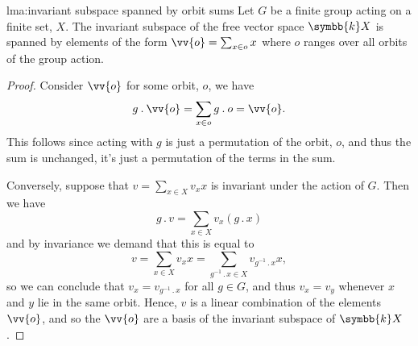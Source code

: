 \documentclass[fleqn]{NotesClass}
\renewcommand{\field}{\symbb{k}}
\newcommand{\action}{\mathbin{.}}
\begin{document}
    \begin{lma}{}{lma:invariant subspace spanned by orbit sums}
        Let \(G\) be a finite group acting on a finite set, \(X\).
        The invariant subspace of the free vector space \(\field X\) is spanned by elements of the form \(\vv{o} = \sum_{x \in o} x\) where \(o\) ranges over all orbits of the group action.
        \begin{proof}
            Consider \(\vv{o}\) for some orbit, \(o\), we have
            \begin{equation}
                g \action \vv{o} = \sum_{x \in o} g \action o = \vv{o}.
            \end{equation}
            This follows since acting with \(g\) is just a permutation of the orbit, \(o\), and thus the sum is unchanged, it's just a permutation of the terms in the sum.
            
            Conversely, suppose that \(v = \sum_{x \in X} v_x x\) is invariant under the action of \(G\).
            Then we have
            \begin{equation}
                g \action v = \sum_{x \in X} v_x (g \action x)
            \end{equation}
            and by invariance we demand that this is equal to
            \begin{equation}
                v = \sum_{x \in X} v_x x = \sum_{g^{-1}\action x \in X} v_{g^{-1} \action x} x,
            \end{equation}
            so we can conclude that \(v_x = v_{g^{-1} \action x}\) for all \(g \in G\), and thus \(v_x = v_y\) whenever \(x\) and \(y\) lie in the same orbit.
            Hence, \(v\) is a linear combination of the elements \(\vv{o}\), and so the \(\vv{o}\) are a basis of the invariant subspace of \(\field X\).
        \end{proof}
    \end{lma}
    
\end{document}
